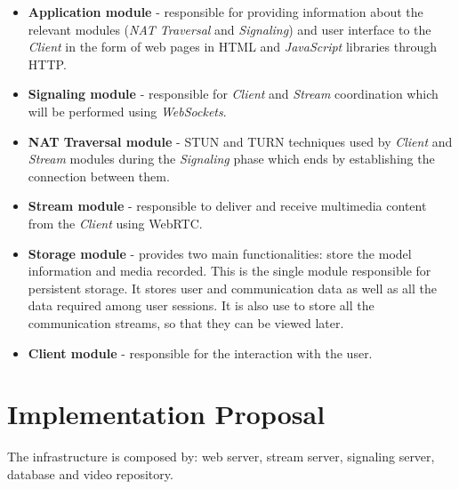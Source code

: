 \begin{itemize}

\item \textbf{Application module} - responsible for providing information about the relevant modules (\emph{NAT Traversal} and \emph{Signaling}) and user interface to the \emph{Client} in the form of web pages in \ac{HTML} and \emph{JavaScript} libraries through \ac{HTTP}.
 
\item \textbf{Signaling module} - responsible for \emph{Client} and \emph{Stream} coordination which will be performed using \emph{WebSockets}.

 \item \textbf{NAT Traversal module} - \ac{STUN} and \ac{TURN} techniques used by \emph{Client} and \emph{Stream} modules during the \emph{Signaling} phase which ends by establishing the connection between them.

 \item \textbf{Stream module} - responsible to deliver and receive multimedia content from the \emph{Client} using \ac{WebRTC}. 

 \item \textbf{Storage module} - provides two main functionalities: store the model information and media recorded. This is the single module responsible for persistent storage. It stores user and communication data as well as all the data required among user sessions. It is also use to store all the communication streams, so that they can be viewed later.

 \item \textbf{Client module} - responsible for the interaction with the user.

\end{itemize}



 
\section{Implementation Proposal}
The infrastructure is composed by: web server, stream server, signaling server, database and video repository.

